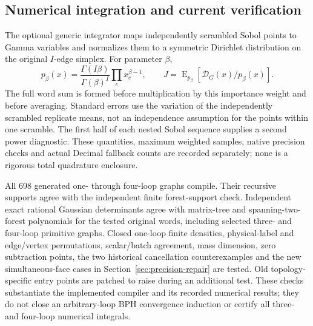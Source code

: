 \subsection{Numerical integration and current verification}

The optional generic integrator maps independently scrambled Sobol
points to Gamma variables and normalizes them to a symmetric Dirichlet
distribution on the original $I$-edge simplex.  For parameter $\beta$,
\[
 p_\beta(x)=\frac{\Gamma(I\beta)}{\Gamma(\beta)^I}
                   \prod_e x_e^{\beta-1},\qquad
 J=\mathop{\mathrm E}_{p_\beta}
                   [\mathcal D_G(x)/p_\beta(x)].
\]
The full word sum is formed before multiplication by this importance
weight and before averaging.  Standard errors use the variation of the
independently scrambled replicate means, not an independence assumption
for the points within one scramble.  The first half of each nested
Sobol sequence supplies a second power diagnostic.  These quantities,
maximum weighted samples, native precision checks and actual Decimal
fallback counts are recorded
separately; none is a rigorous total quadrature enclosure.

All 698 generated one- through four-loop graphs compile.  Their recursive
supports agree with the independent finite forest-support check.
Independent exact rational Gaussian determinants agree with
matrix-tree and spanning-two-forest polynomials for the tested original
words, including selected three- and four-loop primitive graphs.
Closed one-loop finite densities, physical-label and edge/vertex
permutations, scalar/batch agreement, mass dimension, zero subtraction
points, the two historical cancellation counterexamples and the new
simultaneous-face cases in Section~\ref{sec:precision-repair} are tested. Old
topology-specific entry points are patched to raise during an additional
test.  These checks substantiate the implemented compiler and its
recorded numerical results; they do not close an arbitrary-loop BPH
convergence induction or certify all three- and four-loop numerical
integrals.
